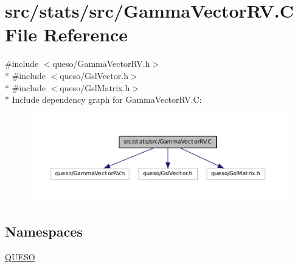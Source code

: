 \hypertarget{_gamma_vector_r_v_8_c}{\section{src/stats/src/\-Gamma\-Vector\-R\-V.C File Reference}
\label{_gamma_vector_r_v_8_c}
}
{\ttfamily \#include $<$queso/\-Gamma\-Vector\-R\-V.\-h$>$}\\*
{\ttfamily \#include $<$queso/\-Gsl\-Vector.\-h$>$}\\*
{\ttfamily \#include $<$queso/\-Gsl\-Matrix.\-h$>$}\\*
Include dependency graph for Gamma\-Vector\-R\-V.\-C\-:
\nopagebreak
\begin{figure}[H]
\begin{center}
\leavevmode
\includegraphics[width=350pt]{_gamma_vector_r_v_8_c__incl}
\end{center}
\end{figure}
\subsection*{Namespaces}
\begin{DoxyCompactItemize}
\item 
\hyperlink{namespace_q_u_e_s_o}{Q\-U\-E\-S\-O}
\end{DoxyCompactItemize}
